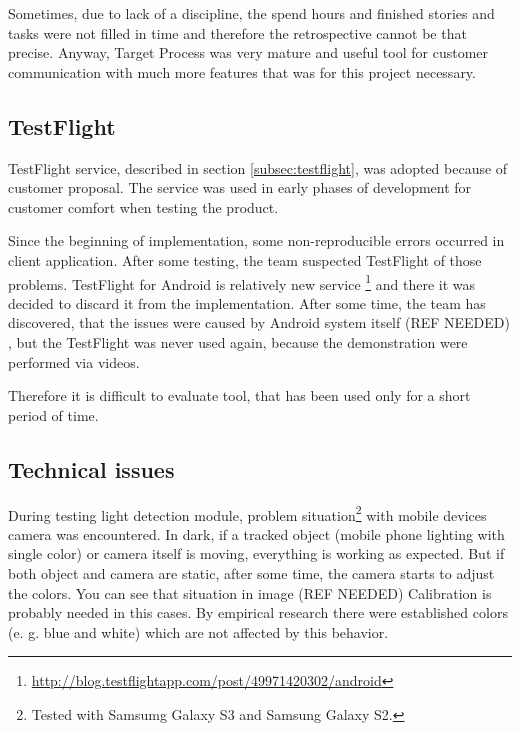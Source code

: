 Sometimes, due to lack of a discipline, the spend hours and finished stories and tasks were not filled in time and therefore the retrospective cannot be that precise.
Anyway, Target Process was very mature and useful tool for customer communication with much more features that was for this project necessary.


\subsection{TestFlight}
TestFlight service, described in section \ref{subsec:testflight}, was adopted because of customer proposal.
The service was used in early phases of development for customer comfort when testing the product.

Since the beginning of implementation, some non-reproducible errors occurred in client application.
After some testing, the team suspected TestFlight of those problems.
TestFlight for Android is relatively new service \footnote{\url{http://blog.testflightapp.com/post/49971420302/android}} and there it was decided to discard it from the implementation.
After some time, the team has discovered, that the issues were caused by Android system itself 
(REF NEEDED)
, but the TestFlight was never used again, because the demonstration were performed via videos.
 
Therefore it is difficult to evaluate tool, that has been used only for a short period of time.

\subsection{Technical issues}
During testing light detection module, problem situation\footnote{Tested with Samsumg Galaxy S3 and Samsung Galaxy S2.} with mobile devices camera was encountered.
In dark, if a tracked object (mobile phone lighting with single color) or camera itself is moving, everything is working as expected.
But if both object and camera are static, after some time, the camera starts to adjust the colors.
You can see that situation in image 
(REF NEEDED)
Calibration is probably needed in this cases.
By empirical research there were established colors (e. g. blue and white) which are not affected by this behavior.
